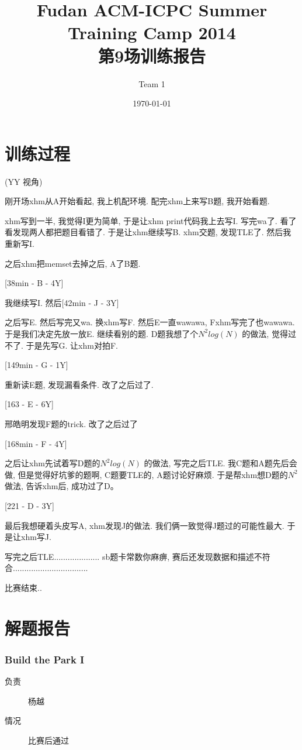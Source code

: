 \documentclass[a4paper, 11pt, nofonts, nocap, fancyhdr]{ctexart}
\title{Fudan ACM-ICPC Summer Training Camp 2014\\第9场训练报告}
\author{Team 1}
\date{\today}
\newcommand{\problem}[1]{\subsubsection{#1}}
\begin{document}
\maketitle

\section{训练过程}

(YY 视角)

刚开场xhm从A开始看起, 我上机配环境. 配完xhm上来写B题, 我开始看题.

xhm写到一半, 我觉得I更为简单, 于是让xhm print代码我上去写I. 写完wa了. 看了看发现两人都把题目看错了. 于是让xhm继续写B. xhm交题, 发现TLE了. 然后我重新写I. 

之后xhm把memset去掉之后, A了B题. 

[38min - B - 4Y]

我继续写I. 然后[42min - J - 3Y]

之后写E. 然后写完又wa. 换xhm写F. 然后E一直wawawa, Fxhm写完了也wawawa. 于是我们决定先放一放E. 继续看别的题. D题我想了个$N^2log(N)$ 的做法, 觉得过不了. 于是先写G. 让xhm对拍F.

[149min - G - 1Y]

重新读E题, 发现漏看条件. 改了之后过了. 

[163 - E - 6Y]

邢皓明发现F题的trick. 改了之后过了

[168min - F - 4Y]

之后让xhm先试着写D题的$N^2log(N)$ 的做法, 写完之后TLE. 我C题和A题先后会做, 但是觉得好坑爹的题啊, C题要TLE的, A题讨论好麻烦. 于是帮xhm想D题的$N^2$做法, 告诉xhm后, 成功过了D。

[221 - D - 3Y]

最后我想硬着头皮写A, xhm发现J的做法. 我们俩一致觉得J题过的可能性最大. 于是让xhm写J.

写完之后TLE.................... sb题卡常数你麻痹, 赛后还发现数据和描述不符合.................................

比赛结束..

\section{解题报告}

\problem{Build the Park I}

\begin{description}
\item[负责] 杨越
\item[情况] 比赛后通过
\end{description}
\end{document}
